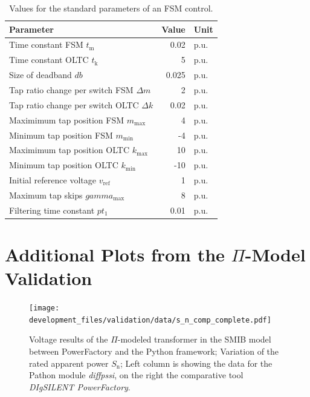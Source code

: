 \begin{table}[H]
    \caption[Values for the standard parameters of an \acs{FSM} control]{Values for the standard parameters of an \acs{FSM} control.}
    \vspace*{12pt}
    \centering
    \small
    \begin{tabularx}{\textwidth}{Xrl}
        \textbf{Parameter} & \textbf{Value} & \textbf{Unit} \\ \hline
        \toprule
        Time constant \acs{FSM}  $t_\mathrm{m}$ & 0.02 & p.u. \\
        Time constant \acs{OLTC} $t_\mathrm{k}$ & 5 & p.u. \\
        Size of deadband $db$ & 0.025 & p.u. \\
        Tap ratio change per switch \acs{FSM} $\Delta m$      & 2 & p.u. \\
        Tap ratio change per switch \acs{OLTC} $\Delta k$      & 0.02 & p.u. \\
        Maximimum tap position \acs{FSM} $m_\mathrm{max}$        & 4 & p.u. \\
        Minimum tap position \acs{FSM} $m_\mathrm{min}$        & -4 & p.u. \\
        Maximimum tap position \acs{OLTC} $k_\mathrm{max}$        & 10 & p.u. \\
        Minimum tap position \acs{OLTC} $k_\mathrm{min}$        & -10 & p.u. \\
        Initial reference voltage $v_\mathrm{ref}$        & 1 & p.u. \\
        Maximum tap skips $gamma_\mathrm{max}$    & 8 & p.u. \\
        Filtering time constant $pt_1$         & 0.01 & p.u. \\
        \bottomrule
    \end{tabularx}
\end{table}

\section{Additional Plots from the  $\Pi$-Model Validation}
\label{app:add-validation-plots}

\begin{figure}[H]
    \centering
    \texttt{[image: development\_files/validation/data/s\_n\_comp\_complete.pdf]}
    \caption[Model results concerning the variation of the rated apparent power]{Voltage results of the $\Pi$-modeled transformer in the \acs{SMIB} model between PowerFactory and the Python framework; Variation of the rated apparent power $S_\mathrm{n}$; Left column is showing the data for the Pathon module \textit{diffpssi}, on the right the comparative tool \textit{DIgSILENT PowerFactory}.}
    \label{fig:valid-s-compl}
\end{figure}

